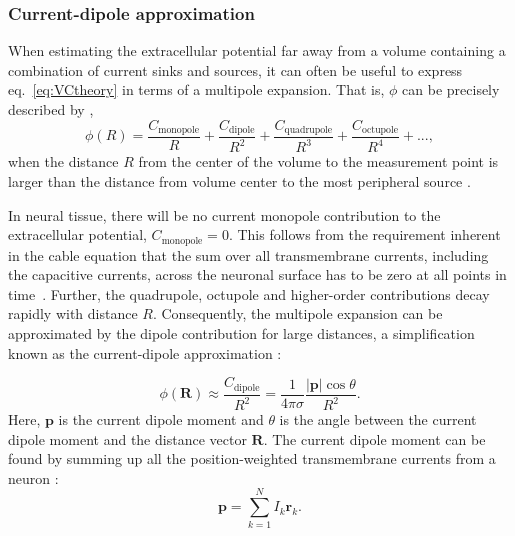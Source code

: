 \documentclass[preprint,11pt,authoryear]{elsarticle}
\newcommand{\hlj}[2][OliveGreen]{ {\sethlcolor{#1} \hl{#2}} }
\newcommand{\hlp}[2][Purple]{ {\sethlcolor{#1} \hl{#2}} }
\newcommand{\tvnnote}[1]{\color{white}{\hlj{TVN: #1 }}\color{black}}
\newcommand{\snnote}[1]{\color{white}{\hlp{SN: #1 }}\color{black}}
\begin{document}
\subsubsection{Current-dipole approximation}
When estimating the extracellular potential far away from a volume containing a combination of current sinks and sources, 
it can often be useful to express eq.~\eqref{eq:VCtheory} in terms of a multipole expansion. 
That is, $\phi$
can be precisely described by \citep{Nunez2006},
\begin{equation}\label{eq:multipole}
\phi(R) = \frac{C_\text{monopole}}{R} + \frac{C_\text{dipole}}{R^2} + \frac{C_\text{quadrupole}}{R^3} + \frac{C_\text{octupole}}{R^4} + ... ,
\end{equation}
when the distance $R$ from the center of the volume to the measurement point is larger than the distance from volume center to the most peripheral source \citep{Jackson1998}. 


In neural tissue, there will be no current monopole contribution to the extracellular potential,  
$C_\text{monopole}=0$. This follows from the requirement inherent in the cable equation that the sum over all transmembrane currents, including the capacitive currents, across the neuronal surface has to be zero at all points in time~\citep{Pettersen2012}.
Further,
the quadrupole, octupole and higher-order contributions decay rapidly with distance $R$. Consequently, the multipole expansion can be approximated by the dipole contribution for large distances, a simplification known as the current-dipole approximation \citep{Nunez2006}:

\begin{equation}\label{eq:CDA}
\phi(\mathbf{R}) \approx \frac{C_\text{dipole}}{R^2} = \frac{1}{4 \pi \sigma} \frac{|\mathbf{p}| \cos \theta}{R^2}.
\end{equation}
Here, $\mathbf{p}$ is the current dipole moment and $\theta$ is the angle between the current dipole moment and the distance vector $\mathbf{R}$. The current dipole moment can be found by summing up all the position-weighted transmembrane currents from a neuron \citep{Pettersen2008, Pettersen2014, Nunez2006}: 
\begin{equation}\label{eq:dipole}
\mathbf{p} = \sum_{k=1}^N I_k \mathbf{r}_k.
\end{equation}
\end{document}
